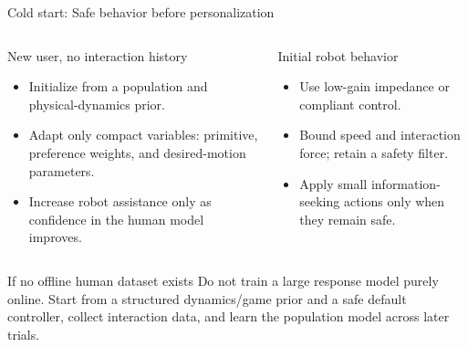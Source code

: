 \documentclass[aspectratio=169,11pt]{beamer}
\begin{document}
\begin{frame}{Cold start: Safe behavior before personalization}
\begin{columns}[T,onlytextwidth]
\begin{block}{New user, no interaction history}
\begin{itemize}
  \item Initialize from a population and physical-dynamics prior.
  \item Adapt only compact variables: primitive, preference weights, and desired-motion parameters.
  \item Increase robot assistance only as confidence in the human model improves.
\end{itemize}
\end{block}
\begin{block}{Initial robot behavior}
\begin{itemize}
  \item Use low-gain impedance or compliant control.
  \item Bound speed and interaction force; retain a safety filter.
  \item Apply small information-seeking actions only when they remain safe.
\end{itemize}
\end{block}
\end{columns}
\vspace{0.02cm}
\begin{alertblock}{If no offline human dataset exists}
Do not train a large response model purely online. Start from a structured dynamics/game prior and a safe default controller, collect interaction data, and learn the population model across later trials.
\end{alertblock}
\end{frame}
\end{document}
